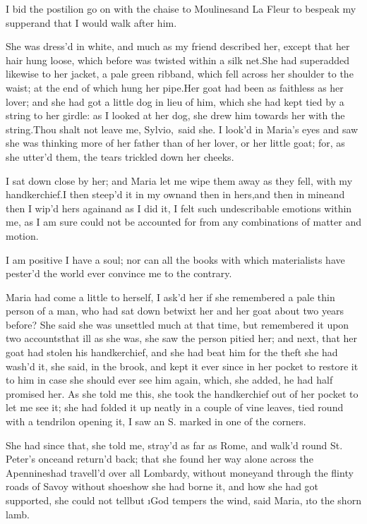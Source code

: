 \documentclass[twoside]{article}
\begin{document}
I bid the postilion go on with the chaise
to Moulines\tskk and La Fleur to bespeak
my supper\tskk and that I would walk
after him.

She was dress’d in white, and much as my
friend described her, except that her hair
hung loose, which before was twisted
within a silk net.\tskk She had superadded
likewise to her jacket, a pale green
ribband, which fell across her shoulder to
the waist; at the end of which hung her
pipe.\tskk Her goat had been as faithless
as her lover; and she had got a little dog
in lieu of him, which she had kept tied by
a string to her girdle: as I looked at her
dog, she drew him towards her with the
string.\tskk \lqq Thou shalt not leave me,
Sylvio,\rqq\ said she.  I look’d in Maria’s
eyes and saw she was thinking more of her
father than of her lover, or her little
goat; for, as she utter’d them, the tears
trickled down her cheeks.

I sat down close by her; and Maria let me
wipe them away as they fell, with my
handkerchief.\tskk I then steep’d it in my
own\tskk and then in hers,\tskk and then
in mine\tskk and then I wip’d hers
again\tskk and as I did it, I felt such
undescribable emotions within me, as I am
sure could not be accounted for from any
combinations of matter and motion.

I am positive I have a soul; nor can all
the books with which materialists have
pester’d the world ever convince me to the
contrary.





\vskip 6pt


 Maria had come a little
to herself, I ask’d her if she remembered
a pale thin person of a man, who had sat
down betwixt her and her goat about two
years before?  She said she was unsettled
much at that time, but remembered it upon
two accounts\tskk that ill as she was,
she saw the person pitied her; and next,
that her goat had stolen his handkerchief,
and she had beat him for the theft\tskk
she had wash’d it, she said, in the brook,
and kept it ever since in her pocket to
restore it to him in case she should ever
see him again, which, she added, he had
half promised her.  As she told me this,
she took the handkerchief out of her
pocket to let me see it; she had folded it
up neatly in a couple of vine leaves, tied
round with a tendril\tskk on opening it,
I saw an S. marked in one of the corners.

She had since that, she told me, stray’d
as far as Rome, and walk’d round St.
Peter’s once\tskk and return’d back;\tskk
that she found her way alone across the
Apennines\tskk had travell’d over all
Lombardy, without money\tskk and through
the flinty roads of Savoy without
shoes\tskk how she had borne it, and how
she had got supported, she could not
tell\tskk but \i{God tempers the wind},
said Maria, \i{to the shorn lamb}.
\end{document}
